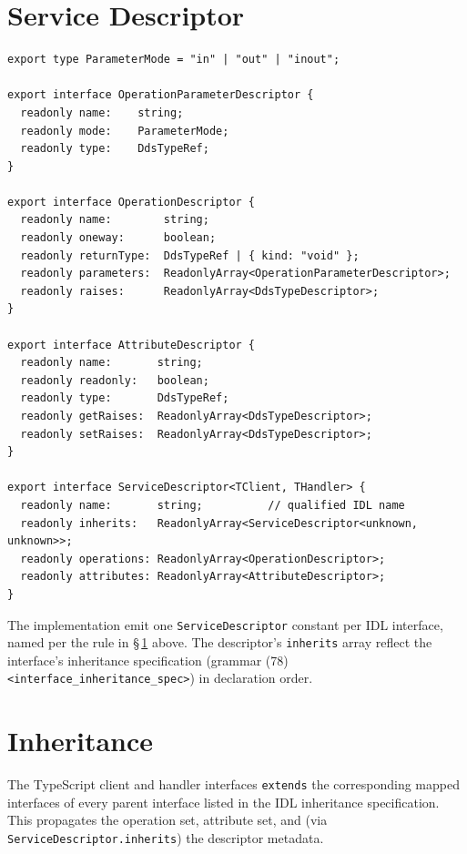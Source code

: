 \documentclass{../styles/zerodds-vendor-spec}
\begin{document}
\section{Service Descriptor}\label{sec:operations-descriptor}

\begin{lstlisting}
export type ParameterMode = "in" | "out" | "inout";

export interface OperationParameterDescriptor {
  readonly name:    string;
  readonly mode:    ParameterMode;
  readonly type:    DdsTypeRef;
}

export interface OperationDescriptor {
  readonly name:        string;
  readonly oneway:      boolean;
  readonly returnType:  DdsTypeRef | { kind: "void" };
  readonly parameters:  ReadonlyArray<OperationParameterDescriptor>;
  readonly raises:      ReadonlyArray<DdsTypeDescriptor>;
}

export interface AttributeDescriptor {
  readonly name:       string;
  readonly readonly:   boolean;
  readonly type:       DdsTypeRef;
  readonly getRaises:  ReadonlyArray<DdsTypeDescriptor>;
  readonly setRaises:  ReadonlyArray<DdsTypeDescriptor>;
}

export interface ServiceDescriptor<TClient, THandler> {
  readonly name:       string;          // qualified IDL name
  readonly inherits:   ReadonlyArray<ServiceDescriptor<unknown, unknown>>;
  readonly operations: ReadonlyArray<OperationDescriptor>;
  readonly attributes: ReadonlyArray<AttributeDescriptor>;
}
\end{lstlisting}

The implementation  emit one
\texttt{ServiceDescriptor} constant per IDL interface, named per
the rule in \S\,\ref{sec:operations-descriptor} above. The
descriptor's \texttt{inherits} array  reflect the
interface's inheritance specification (grammar (78)
\texttt{<interface\_inheritance\_spec>}) in declaration order.

\section{Inheritance}\label{sec:operations-inheritance}

The TypeScript client and handler interfaces 
\texttt{extends} the corresponding mapped interfaces of every
parent interface listed in the IDL inheritance specification.
This propagates the operation set, attribute set, and (via
\texttt{Service\-Descriptor.inherits}) the descriptor metadata.
\end{document}

